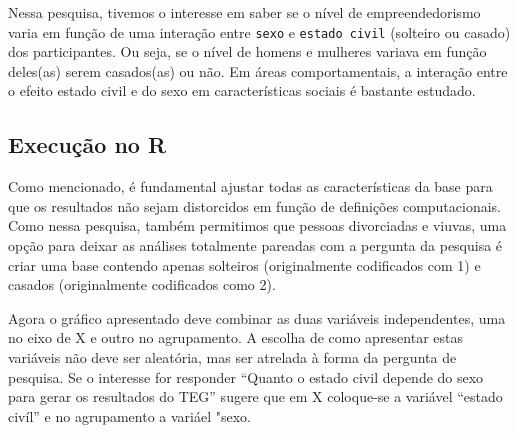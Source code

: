 \documentclass[
]{book}
\newenvironment{Shaded}{\begin{snugshade}}{\end{snugshade}}
\newcommand{\DataTypeTok}[1]{\textcolor[rgb]{0.13,0.29,0.53}{#1}}
\newcommand{\DecValTok}[1]{\textcolor[rgb]{0.00,0.00,0.81}{#1}}
\newcommand{\KeywordTok}[1]{\textcolor[rgb]{0.13,0.29,0.53}{\textbf{#1}}}
\newcommand{\NormalTok}[1]{#1}
\newcommand{\OperatorTok}[1]{\textcolor[rgb]{0.81,0.36,0.00}{\textbf{#1}}}
\newcommand{\StringTok}[1]{\textcolor[rgb]{0.31,0.60,0.02}{#1}}
\begin{document}
Nessa pesquisa, tivemos o interesse em saber se o nível de empreendedorismo varia em função de uma interação entre \texttt{sexo} e \texttt{estado\ civil} (solteiro ou casado) dos participantes. Ou seja, se o nível de homens e mulheres variava em função deles(as) serem casados(as) ou não. Em áreas comportamentais, a interação entre o efeito estado civil e do sexo em características sociais é bastante estudado.

\hypertarget{execuuxe7uxe3o-no-r-3}{%
\subsection{Execução no R}\label{execuuxe7uxe3o-no-r-3}}

Como mencionado, é fundamental ajustar todas as características da base para que os resultados não sejam distorcidos em função de definições computacionais. Como nessa pesquisa, também permitimos que pessoas divorciadas e viuvas, uma opção para deixar as análises totalmente pareadas com a pergunta da pesquisa é criar uma base contendo apenas solteiros (originalmente codificados com 1) e casados (originalmente codificados como 2).

\begin{Shaded}
\end{Shaded}

Agora o gráfico apresentado deve combinar as duas variáveis independentes, uma no eixo de X e outro no agrupamento. A escolha de como apresentar estas variáveis não deve ser aleatória, mas ser atrelada à forma da pergunta de pesquisa. Se o interesse for responder ``Quanto o estado civil depende do sexo para gerar os resultados do TEG'' sugere que em X coloque-se a variável ``estado civíl'' e no agrupamento a variáel "sexo.
\end{document}

